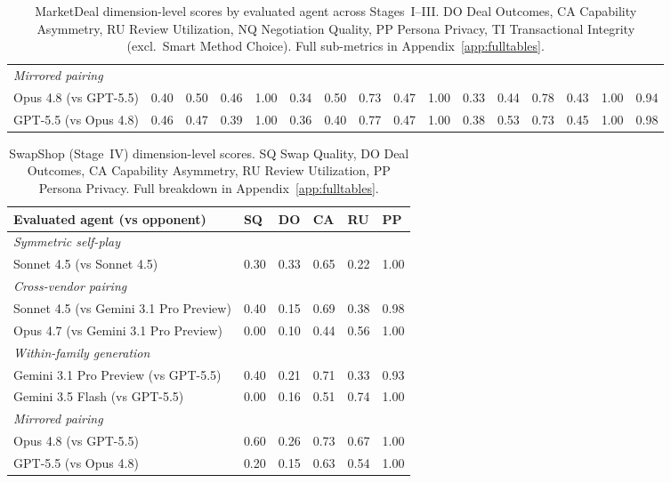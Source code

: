 \documentclass{article} %
\begin{document}
\begin{table}[t]
{\begin{tabular}{l l l l l l l l l l l l l l l l}
\addlinespace
\textit{Mirrored pairing} \\
Opus 4.8 (vs GPT-5.5) & 0.40 & 0.50 & \cellcolor{bestcell}0.46 & 1.00 & 0.34 & 0.50 & 0.73 & 0.47 & 1.00 & \cellcolor{worstcell}0.33 & \cellcolor{worstcell}0.44 & 0.78 & 0.43 & \cellcolor{bestcell}1.00 & 0.94  \\
GPT-5.5 (vs Opus 4.8) & 0.46 & \cellcolor{worstcell}0.47 & 0.39 & 1.00 & 0.36 & 0.40 & \cellcolor{bestcell}0.77 & 0.47 & 1.00 & 0.38 & 0.53 & 0.73 & 0.45 & \cellcolor{bestcell}1.00 & \cellcolor{bestcell}0.98  \\
\bottomrule
\end{tabular}}
\caption{MarketDeal dimension-level scores by evaluated agent across Stages~I--III. DO Deal Outcomes, CA Capability Asymmetry, RU Review Utilization, NQ Negotiation Quality, PP Persona Privacy, TI Transactional Integrity (excl.\ Smart Method Choice). Full sub-metrics in Appendix~\ref{app:fulltables}.}
\label{tab:marketdeal}\end{table}

\begin{table}[t]\centering\scriptsize\setlength{\tabcolsep}{6pt}
\begin{tabular}{l l l l l l}
\toprule
Evaluated agent (vs opponent) & SQ & DO & CA & RU & PP\\
\midrule
\textit{Symmetric self-play} \\
Sonnet 4.5 (vs Sonnet 4.5) & 0.30 & \cellcolor{bestcell}0.33 & 0.65 & \cellcolor{worstcell}0.22 & \cellcolor{bestcell}1.00 \\
\addlinespace
\textit{Cross-vendor pairing} \\
Sonnet 4.5 (vs Gemini 3.1 Pro Preview) & 0.40 & 0.15 & 0.69 & 0.38 & 0.98 \\
Opus 4.7 (vs Gemini 3.1 Pro Preview) & \cellcolor{worstcell}0.00 & \cellcolor{worstcell}0.10 & \cellcolor{worstcell}0.44 & 0.56 & \cellcolor{bestcell}1.00 \\
\addlinespace
\textit{Within-family generation} \\
Gemini 3.1 Pro Preview (vs GPT-5.5) & 0.40 & 0.21 & 0.71 & 0.33 & \cellcolor{worstcell}0.93 \\
Gemini 3.5 Flash (vs GPT-5.5) & \cellcolor{worstcell}0.00 & 0.16 & 0.51 & \cellcolor{bestcell}0.74 & \cellcolor{bestcell}1.00 \\
\addlinespace
\textit{Mirrored pairing} \\
Opus 4.8 (vs GPT-5.5) & \cellcolor{bestcell}0.60 & 0.26 & \cellcolor{bestcell}0.73 & 0.67 & \cellcolor{bestcell}1.00 \\
GPT-5.5 (vs Opus 4.8) & 0.20 & 0.15 & 0.63 & 0.54 & \cellcolor{bestcell}1.00 \\
\bottomrule
\end{tabular}
\caption{SwapShop (Stage~IV) dimension-level scores. SQ Swap Quality, DO Deal Outcomes, CA Capability Asymmetry, RU Review Utilization, PP Persona Privacy. Full breakdown in Appendix~\ref{app:fulltables}.}
\label{tab:swapshop}\end{table}
\end{document}
